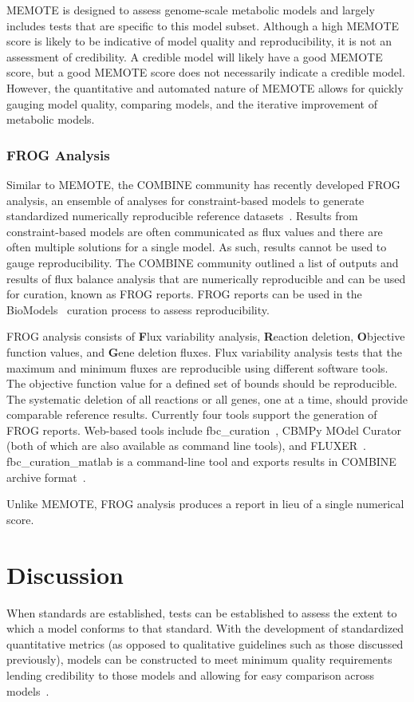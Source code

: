 \documentclass[12pt]{report}
\begin{document}
MEMOTE is designed to assess genome-scale metabolic models and largely includes tests that are specific to this model subset. Although a high MEMOTE score is likely to be indicative of model quality and reproducibility, it is not an assessment of credibility. A credible model will likely have a good MEMOTE score, but a good MEMOTE score does not necessarily indicate a credible model. However, the quantitative and automated nature of MEMOTE allows for quickly gauging model quality, comparing models, and the iterative improvement of metabolic models.

\subsubsection{FROG Analysis}
Similar to MEMOTE, the COMBINE community has recently developed FROG analysis, an ensemble of analyses for constraint-based models to generate standardized numerically reproducible reference datasets~\cite{sbmlsim21}. Results from constraint-based models are often communicated as flux values and there are often multiple solutions for a single model. As such, results cannot be used to gauge reproducibility. The COMBINE community outlined a list of outputs and results of flux balance analysis that are numerically reproducible and can be used for curation, known as FROG reports. FROG reports can be used in the BioModels~\cite{BioModels2018a, BioModels2020} curation process to assess reproducibility.

FROG analysis consists of  \textbf{F}lux variability analysis, \textbf{R}eaction deletion, \textbf{O}bjective function values, and \textbf{G}ene deletion fluxes. Flux variability analysis tests that the maximum and minimum fluxes are reproducible using different software tools. The objective function value for a defined set of bounds should be reproducible. The systematic deletion of all reactions or all genes, one at a time, should provide comparable reference results. Currently four tools support the generation of FROG reports. Web-based tools include fbc\_curation~\cite{sbmlsim21}, CBMPy MOdel Curator~\cite{SBMpy} (both of which are also available as command line tools), and FLUXER~\cite{hari2020}. fbc\_curation\_matlab is a command-line tool and exports results in COMBINE archive format~\cite{fbc_curation}.

Unlike MEMOTE, FROG analysis produces a report in lieu of a single numerical score. 

\section{Discussion}
When standards are established, tests can be established to assess the extent to which a model conforms to that standard. With the development of standardized quantitative metrics (as opposed to qualitative guidelines such as those discussed previously), models can be constructed to meet minimum quality requirements lending credibility to those models and allowing for easy comparison across models~\cite{Kaddi2007-js}. 
\end{document}
